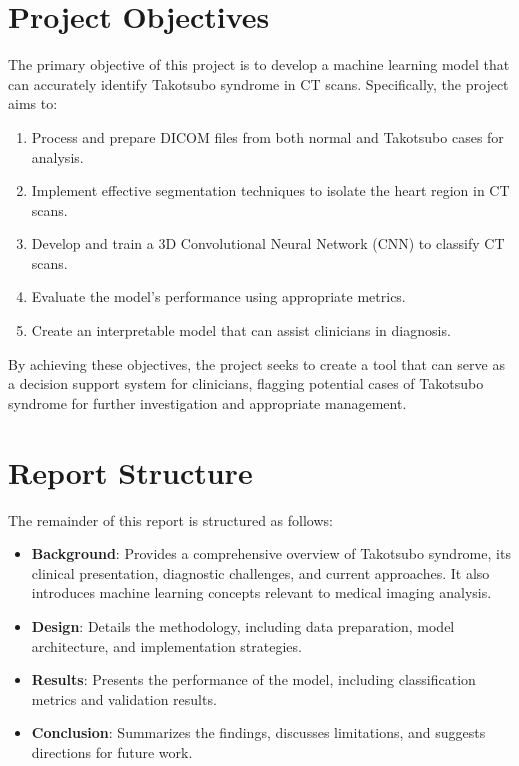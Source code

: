 \documentclass[12pt, BSc]{muthesis}
\begin{document}
\section{Project Objectives}
The primary objective of this project is to develop a machine learning model that can accurately identify Takotsubo syndrome in CT scans. Specifically, the project aims to:
\begin{enumerate}
    \item Process and prepare DICOM files from both normal and Takotsubo cases for analysis.
    \item Implement effective segmentation techniques to isolate the heart region in CT scans.
    \item Develop and train a 3D Convolutional Neural Network (CNN) to classify CT scans.
    \item Evaluate the model's performance using appropriate metrics.
    \item Create an interpretable model that can assist clinicians in diagnosis.
\end{enumerate}

By achieving these objectives, the project seeks to create a tool that can serve as a decision support system for clinicians, flagging potential cases of Takotsubo syndrome for further investigation and appropriate management.



\section{Report Structure}
The remainder of this report is structured as follows:
\begin{itemize}
    \item \textbf{Background}: Provides a comprehensive overview of Takotsubo syndrome, its clinical presentation, diagnostic challenges, and current approaches. It also introduces machine learning concepts relevant to medical imaging analysis.
    \item \textbf{Design}: Details the methodology, including data preparation, model architecture, and implementation strategies.
    \item \textbf{Results}: Presents the performance of the model, including classification metrics and validation results.
    \item \textbf{Conclusion}: Summarizes the findings, discusses limitations, and suggests directions for future work.
\end{itemize}
\end{document}
